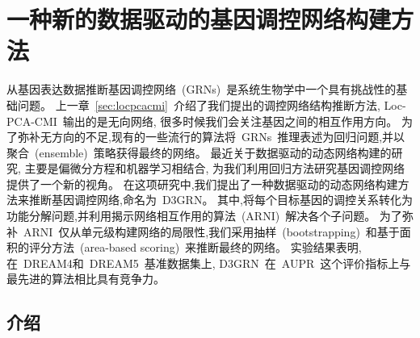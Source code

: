 \section{一种新的数据驱动的基因调控网络构建方法}
\label{sec:d3grn}

从基因表达数据推断基因调控网络~(GRNs)~是系统生物学中一个具有挑战性的基础问题。
上一章~\ref{sec:locpcacmi}~介绍了我们提出的调控网络结构推断方法,
Loc-PCA-CMI~输出的是无向网络, 很多时候我们会关注基因之间的相互作用方向。
为了弥补无方向的不足,现有的一些流行的算法将~GRNs~推理表述为回归问题,并以聚合~(ensemble)~策略获得最终的网络。
最近关于数据驱动的动态网络构建的研究, 主要是偏微分方程和机器学习相结合, 
为我们利用回归方法研究基因调控网络提供了一个新的视角。
在这项研究中,我们提出了一种数据驱动的动态网络构建方法来推断基因调控网络,命名为~D3GRN。
其中,将每个目标基因的调控关系转化为功能分解问题,并利用揭示网络相互作用的算法~(ARNI)~解决各个子问题。
为了弥补~ARNI~仅从单元级构建网络的局限性,我们采用抽样~(bootstrapping)~和基于面积的评分方法~(area-based scoring)~来推断最终的网络。
实验结果表明, 在~DREAM4和~DREAM5~基准数据集上, D3GRN~在~AUPR~这个评价指标上与最先进的算法相比具有竞争力。

\subsection{介绍}



